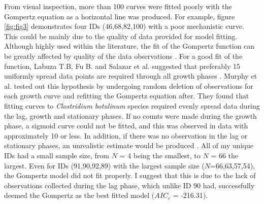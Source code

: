 \documentclass[11pt]{article}
\begin{document}
From visual inspection, more than 100 curves were fitted poorly with the Gompertz equation as a horizontal line was produced. For example, figure \ref{fig:fig3} demonstrates 
four IDs (46,68,82,100) with a poor mechanistic curve. This could be mainly due to the quality of data provided for model fitting. Although highly used within the literature, the fit of the Gompertz function can be
greatly affected by quality of the data observations \cite{labuza_growth_1993}. For a good fit of the function, Labuza T.B, Fu B. and Salazar et al. suggested that preferably 15 uniformly spread
data points are required through all growth phases \cite{labuza_growth_1993,salazar_primary_2021}. Murphy et al. tested out this hypothesis by undergoing random deletion of observations
for each growth curve and refitting the Gompertz equation after. They found that fitting curves to \emph{Clostridium botulinum} species required evenly spread data
during the lag, growth and stationary phases. If no counts were made during the growth phase, a sigmoid curve could not be fitted, and this was
observed in data with approximately 10 or less. In addition, if there was no observation in the lag or stationary phases, an unrealistic 
estimate would be produced \cite{murphy_development_1996}. All of my unique IDs had a small sample size, from $N$ = 4 being the smallest, to $N$ = 66 the largest. Even for IDs
(91,90,92,89) with the largest sample size ($N$=66,63,57,54), the Gompertz model did not fit properly. I suggest that this is due to the lack
of observations collected during the lag phase, which unlike ID 90 had, successfully deemed the Gompertz as the best fitted model ($AIC_{c}$ = -216.31). 
\end{document}

